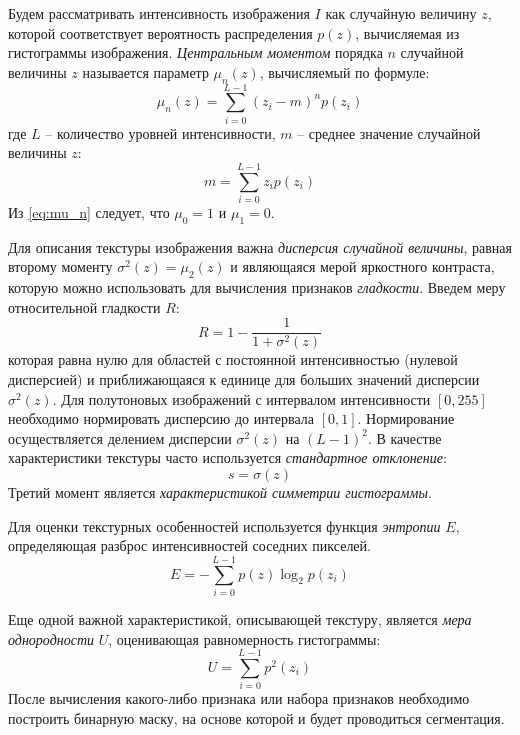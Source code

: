 Будем рассматривать интенсивность изображения $I$ как случайную величину $z$, которой соответствует вероятность распределения 
$p(z)$, вычисляемая из гистограммы изображения. \textit{Центральным моментом} порядка $n$
случайной величины $z$ называется параметр $\mu_n(z)$, вычисляемый по формуле: 
\begin{equation}
    \mu_n(z) = \sum_{i = 0}^{L - 1} (z_i - m)^n p(z_i)
    \label{eq:mu_n}
\end{equation}
где $L$ -- количество уровней интенсивности, $m$ -- среднее значение случайной величины $z$: 
\begin{equation}
    m = \sum_{i = 0}^{L - 1} z_i p(z_i)
\end{equation}
Из \eqref{eq:mu_n} следует, что $\mu_0 = 1$ и $\mu_1 = 0$. 

Для описания текстуры изображения важна \textit{дисперсия случайной величины}, равная второму моменту 
$\sigma^2(z) = \mu_2(z)$ и являющаяся мерой яркостного контраста, которую можно использовать для вычисления 
признаков \textit{гладкости}. Введем меру относительной гладкости $R$:
\begin{equation}
    R = 1 - \frac{1}{1 + \sigma^2(z)}
\end{equation}
которая равна нулю для областей с постоянной интенсивностью (нулевой дисперсией) и приближающаяся к единице 
для больших значений дисперсии $\sigma^2(z)$. Для полутоновых изображений с интервалом интенсивности $[0, 255]$ 
необходимо нормировать дисперсию до интервала $[0, 1]$. Нормирование осуществляется делением дисперсии $\sigma^2(z)$
на $(L - 1)^2$. В качестве характеристики текстуры часто используется \textit{стандартное отклонение}:
\begin{equation}
    s = \sigma(z)
\end{equation}
Третий момент является \textit{характеристикой симметрии гистограммы}. 

Для оценки текстурных особенностей используется 
функция \textit{энтропии} $E$, определяющая разброс интенсивностей соседних пикселей. 
\begin{equation}
    E = -\sum_{i = 0}^{L - 1} p(z) \log_2 p(z_i)
\end{equation}

Еще одной важной характеристикой, описывающей текстуру, является \textit{мера однородности} $U$, оценивающая равномерность гистограммы: 
\begin{equation}
    U = \sum_{i = 0}^{L - 1} p^2(z_i)
\end{equation}
После вычисления какого-либо признака или набора признаков необходимо построить бинарную маску, на основе которой и будет проводиться сегментация. 

